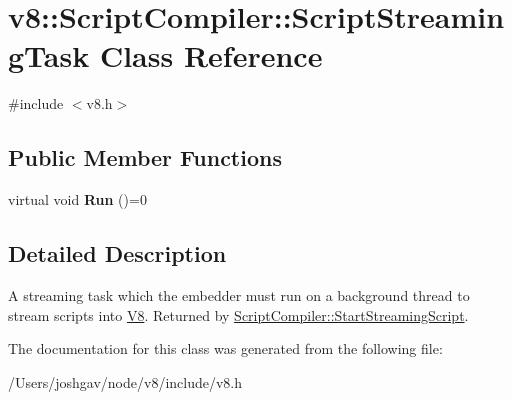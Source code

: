 \hypertarget{classv8_1_1_script_compiler_1_1_script_streaming_task}{}\section{v8\+:\+:Script\+Compiler\+:\+:Script\+Streaming\+Task Class Reference}
\label{classv8_1_1_script_compiler_1_1_script_streaming_task}


{\ttfamily \#include $<$v8.\+h$>$}

\subsection*{Public Member Functions}
\begin{DoxyCompactItemize}
\item 
virtual void {\bfseries Run} ()=0\hypertarget{classv8_1_1_script_compiler_1_1_script_streaming_task_a8eb7a750cbd26ee62c70067c0408c3e1}{}\label{classv8_1_1_script_compiler_1_1_script_streaming_task_a8eb7a750cbd26ee62c70067c0408c3e1}

\end{DoxyCompactItemize}


\subsection{Detailed Description}
A streaming task which the embedder must run on a background thread to stream scripts into \hyperlink{classv8_1_1_v8}{V8}. Returned by \hyperlink{classv8_1_1_script_compiler_a406bb44ef02d644d94bccd3f7b04f2d4}{Script\+Compiler\+::\+Start\+Streaming\+Script}. 

The documentation for this class was generated from the following file\+:\begin{DoxyCompactItemize}
\item 
/\+Users/joshgav/node/v8/include/v8.\+h\end{DoxyCompactItemize}

